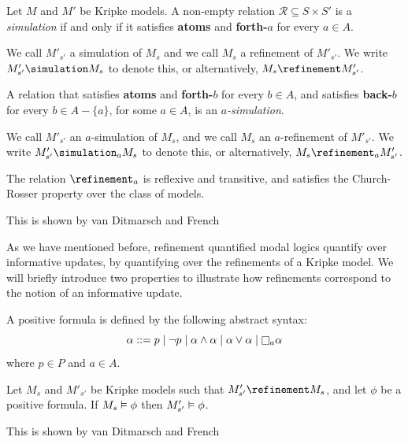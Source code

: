 \begin{definition}
Let $M$ and $M'$ be Kripke models. A non-empty relation $\mathcal{R}
\subseteq S \times S'$ is a \textit{simulation} if and only if it satisfies {\bf
atoms} and {\bf forth-$a$} for every $a \in A$.

We call $M'_{s'}$ a simulation of $M_s$ and we call $M_s$ a refinement of
$M'_{s'}$. We write $M'_{s'} \simulation M_s$ to denote this, or alternatively,
$M_s \refinement M'_{s'}$.

A relation that satisfies {\bf atoms} and {\bf forth-$b$} for every $b \in A$,
and satisfies {\bf back-$b$} for every $b \in A - \{a\}$, for some $a \in A$, is
an $a$\textit{-simulation}. 

We call $M'_{s'}$ an $a$-simulation of $M_s$, and we call $M_s$ an
$a$-refinement of $M'_{s'}$. We write $M'_{s'} \simulation_a M_s$ to denote
this, or alternatively, $M_s \refinement_a M'_{s'}$.
\end{definition}

\begin{lemma}\label{semantics-preorder}
The relation $\refinement_a$ is reflexive and transitive, and satisfies the
Church-Rosser property over the class of \classK{} models.
\end{lemma}

This is shown by van Ditmarsch and French~\cite{french2009simulation}

As we have mentioned before, refinement quantified modal logics quantify over
informative updates, by quantifying over the refinements of a Kripke model. We
will briefly introduce two properties to illustrate how refinements correspond
to the notion of an informative update.

\begin{definition}
A positive formula is defined by the following abstract syntax:
$$
\alpha ::=    p \bnfalt 
            \neg p \bnfalt
            \alpha \land \alpha \bnfalt
            \alpha \lor \alpha \bnfalt
            \knows_a \alpha
$$
where $p \in P$ and $a \in A$.
\end{definition}

\begin{proposition}\label{pre-positive}
Let $M_s$ and $M'_{s'}$ be Kripke models such that $M'_{s'} \refinement M_s$,
and let $\phi$ be a positive formula. If $M_s \vDash \phi$ then $M'_{s'}
\vDash \phi$. 
\end{proposition}

This is shown by van Ditmarsch and French~\cite{french2009simulation}

